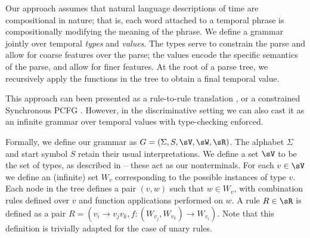 Our approach assumes that natural language descriptions
	of time are compositional in nature; that is,
  each word attached to a temporal phrase is 
	compositionally modifying the meaning of the phrase.
We define a grammar jointly over temporal \textit{types} and
  \textit{values}.
The types serve to constrain the parse and allow for coarse features over the
  parse;
  the values encode the specific semantics of the parse, and allow for finer
  features.
At the root of a parse tree, we recursively apply the functions in the tree
	to obtain a final temporal value.

This approach can been presented as a rule-to-rule translation
	\cite[p.~263]{key:1976bach-semantics,key:1995allen-semantics},
	or a constrained Synchronous PCFG
	\cite{key:2001yamada-syntaxmt}.
However, in the discriminative setting we can also cast it as an infinite
  grammar over temporal values with type-checking enforced.


Formally, we define our  grammar as
	\mbox{$G=\left(\Sigma,S,\sV,\sW,\sR\right)$}.
The alphabet $\Sigma$ and start symbol $S$ retain their usual interpretations.
We define a set $\sV$ to be the set of types, as described in
	 -- these act as our nonterminals.
For each $v \in \sV$ we define an (infinite) set $W_v$ corresponding to the 
	possible instances of type $v$.
Each node in the tree defines a pair $(v,w)$ such that $w \in W_v$,
	with combination rules defined over $v$ and function applications performed
	on $w$.
A rule \mbox{$R \in \sR$} is defined as a pair 
	\mbox{$R = \left(v_i \rightarrow v_jv_k, 
		f : (W_{v_j},W_{v_k}) \rightarrow W_{v_i}\right)$}.
Note that this definition is trivially adapted for the case of unary rules.

